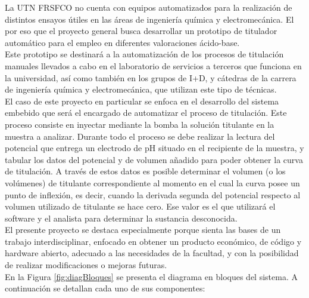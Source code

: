 \documentclass[11pt]{charter}
\begin{document}
 La UTN FRSFCO no cuenta con equipos automatizados para la realización de distintos ensayos útiles en las áreas de ingeniería química y electromecánica. El por eso que el proyecto general busca desarrollar un prototipo de titulador automático para el empleo en diferentes valoraciones ácido-base.\\
 Este prototipo se destinará a la automatización de los procesos de titulación manuales llevados a cabo en el laboratorio de servicios a terceros que funciona en la universidad, así como también en los grupos de I+D, y cátedras de la carrera de ingeniería química y electromecánica, que utilizan este tipo de técnicas.\\
El caso de este proyecto en particular se enfoca en el desarrollo del sistema embebido que será el encargado de automatizar el proceso de titulación. Este proceso consiste en inyectar mediante la bomba la solución titulante en la muestra a analizar. Durante todo el proceso se debe realizar la lectura del potencial que entrega un electrodo de pH situado en el recipiente de la muestra, y tabular los datos del potencial y de volumen añadido para poder obtener la curva de titulación. A través de estos datos es posible determinar el volumen (o los volúmenes) de titulante correspondiente al momento en el cual la curva posee un punto de inflexión, es decir, cuando la derivada segunda del potencial respecto al volumen utilizado de titulante se hace cero. Ese valor es el que utilizará el software y el analista para determinar la sustancia desconocida.\\
El presente proyecto se destaca especialmente porque sienta las bases de un trabajo interdisciplinar, enfocado en obtener un producto económico, de código y hardware abierto, adecuado a las necesidades de la facultad, y con la posibilidad de realizar modificaciones o mejoras futuras.\\
En la Figura \ref{fig:diagBloques} se presenta el diagrama en bloques del sistema. A continuación se detallan cada uno de sus componentes:
\end{document}
